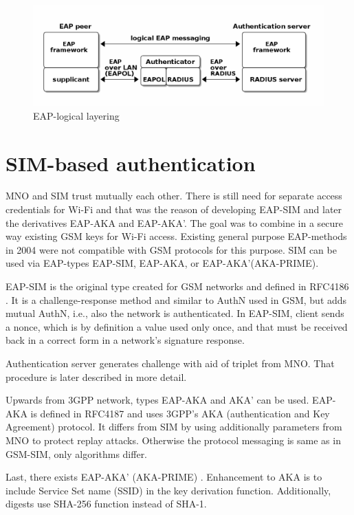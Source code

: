 \documentclass[12pt,a4paper,english]{tutthesis}
\begin{document}
\begin{figure}[htb]
\centering
\includegraphics[width=.9\linewidth]{eap-layer.png}
\caption{\label{fig:eap-layers}EAP-logical layering}
\end{figure}






\section{SIM-based authentication}
\label{sec-2-5}
\label{sec:sim-based-auth}
MNO and SIM trust mutually each other.
There is still need for separate access credentials for Wi-Fi and
that was the reason of developing EAP-SIM and later the derivatives
EAP-AKA and EAP-AKA'.
The goal was to combine in a secure way existing GSM keys for Wi-Fi
access. Existing general purpose EAP-methods in 2004 were not
compatible with GSM protocols for this purpose. \cite[p.93]{hav-doc}
SIM can be used via EAP-types EAP-SIM,
EAP-AKA, or EAP-AKA'(AKA-PRIME).

EAP-SIM is the original type created for GSM networks and defined 
in RFC4186 \cite{rfc4186}.
It is a challenge-response method and similar to AuthN used in GSM, 
but adds mutual AuthN, i.e., also the network is authenticated.
In EAP-SIM, client sends a nonce, which is by definition a
value used only once, and that must be received back
in a correct form in a network's signature response. 

Authentication server generates challenge with aid of
triplet from MNO.
That procedure is later described in more detail.

Upwards from 3GPP network, types EAP-AKA and AKA' can be used.
EAP-AKA is defined in RFC4187 \cite{rfc4187} and
 uses 3GPP's AKA (authentication and Key Agreement) protocol.
It differs from SIM by using additionally parameters from MNO to
protect replay attacks. Otherwise the protocol messaging is same
as in  GSM-SIM, only algorithms differ.


Last, there exists EAP-AKA' (AKA-PRIME) \cite{rfc5448}.
Enhancement to AKA is to include Service Set name (SSID) 
in the key derivation function. Additionally, digests use SHA-256
function instead of SHA-1.
\end{document}
